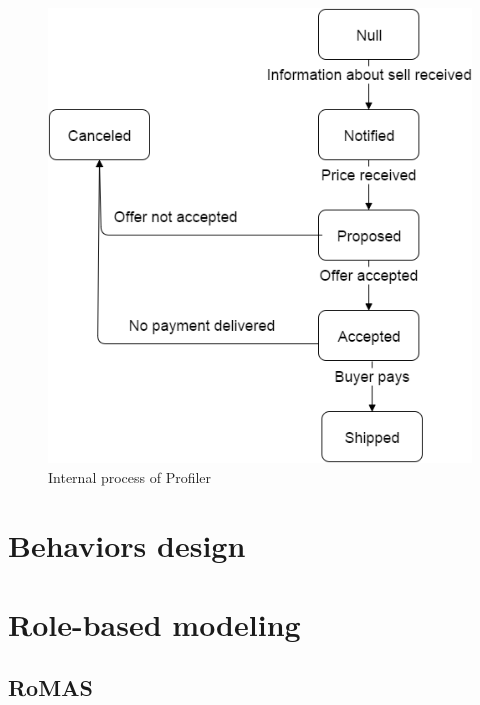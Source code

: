 \documentclass[a4paper,11pt]{report}
\begin{document}
   \begin{figure}[ht!]
    \centering
    \includegraphics[width=\textwidth]{media/statechart_profiler.png}
    \caption{Internal process of Profiler}
    \label{figure:statechartProfiler}
   \end{figure}
   
  
  
  \section{Behaviors design} %
  

  
  
  \section{Role-based modeling} %
  
  \subsection{RoMAS}
  
\end{document}
